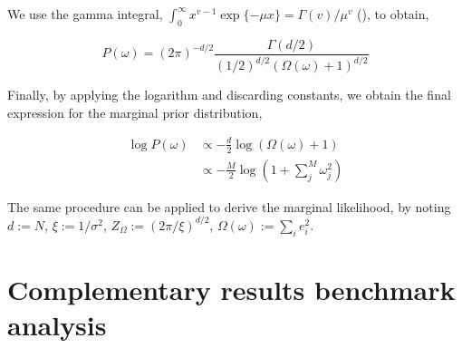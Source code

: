\documentclass[11pt, oneside]{article}
\begin{document}
We use the gamma integral, $\int_{0}^{\infty} x^{v-1} \exp\{-\mu x\} = \Gamma(v)/\mu^{v}$ (\cite{Cawley2007}), to obtain,

\vspace{-0.5cm}
\begin{equation}
    P(\omega) = (2\pi)^{-d/2} \frac{\Gamma(d/2)}{(1/2)^{d/2}\left(\Omega(\omega)+1\right)^{d/2}} 
\end{equation}

Finally, by applying the logarithm and discarding constants, we obtain the final expression for the marginal prior distribution,

\vspace{-0.5cm}
\begin{equation}
\begin{aligned}
    \log P(\omega) &\propto - \frac{d}{2} \log \left(\Omega(\omega)+1\right) \\
    &\propto -\frac{M}{2} \log \left(1 + \sum_j^M \omega_j^2 \right)
\end{aligned}
\end{equation}

The same procedure can be applied to derive the marginal likelihood, by noting $d := N$, $\xi := 1/\sigma^2$, $Z_\Omega := (2\pi/\xi)^{d/2}$, $\Omega(\omega) := \sum_i e_i^2$.

\newpage
\section{Complementary results benchmark analysis}
\end{document}
